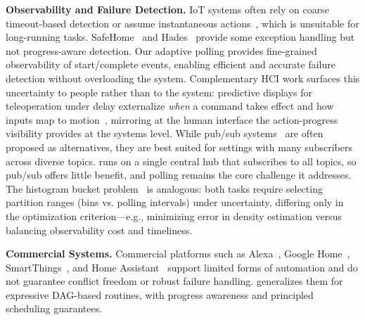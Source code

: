 \noindent \textbf{Observability and Failure Detection.}  
IoT systems often rely on coarse timeout-based detection or assume instantaneous actions~\cite{kashef2021wireless}, which is unsuitable for long-running tasks. 
SafeHome~\cite{SafeHomeEuroSys2021} and Hades~\cite{hades} provide some exception handling but not progress-aware detection. 
Our adaptive polling provides fine-grained observability of start/complete events, enabling efficient and accurate failure detection without overloading the system.
Complementary HCI work surfaces this uncertainty to people rather than to the system: predictive displays for teleoperation under delay externalize \emph{when} a command takes effect and how inputs map to motion~\cite{cardinaels2026motion}, mirroring at the human interface the action-progress visibility \sysname{} provides at the systems level.
While pub/sub systems~\cite{gryphon,carzaniga2001design,aguilera1999matching,segall1997elvin} are often proposed as alternatives, they are best suited for settings with many subscribers across diverse topics. \sysname{} runs on a single central hub that subscribes to all topics, so pub/sub offers little benefit, and polling remains the core challenge it addresses.
The histogram bucket problem~\cite{scott1979optimal,freedman1981histogram,knuth2006optimal,scargle2013studies,jagadish1998optimal} is analogous: both tasks require selecting partition ranges (bins vs. polling intervals) under uncertainty, differing only in the optimization criterion—e.g., minimizing error in density estimation versus balancing observability cost and timeliness.

\noindent \textbf{Commercial Systems.}  
Commercial platforms such as Alexa~\cite{Alexa}, Google Home~\cite{GoogleHome}, SmartThings~\cite{SmartThings}, and Home Assistant~\cite{HomeAssistant} support limited forms of automation and do not guarantee conflict freedom or robust failure handling. 
\abs{} generalizes them for expressive DAG-based routines, with progress awareness and principled scheduling guarantees.
